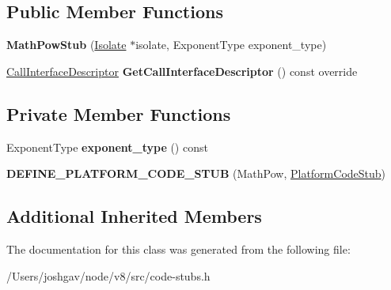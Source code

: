 \subsection*{Public Member Functions}
\begin{DoxyCompactItemize}
\item 
{\bfseries Math\+Pow\+Stub} (\hyperlink{classv8_1_1internal_1_1_isolate}{Isolate} $\ast$isolate, Exponent\+Type exponent\+\_\+type)\hypertarget{classv8_1_1internal_1_1_math_pow_stub_a335e2c420956b65d5c11c4f03143b7e0}{}\label{classv8_1_1internal_1_1_math_pow_stub_a335e2c420956b65d5c11c4f03143b7e0}

\item 
\hyperlink{classv8_1_1internal_1_1_call_interface_descriptor}{Call\+Interface\+Descriptor} {\bfseries Get\+Call\+Interface\+Descriptor} () const  override\hypertarget{classv8_1_1internal_1_1_math_pow_stub_a67765b43b43abda4e5aefa9829fa8385}{}\label{classv8_1_1internal_1_1_math_pow_stub_a67765b43b43abda4e5aefa9829fa8385}

\end{DoxyCompactItemize}
\subsection*{Private Member Functions}
\begin{DoxyCompactItemize}
\item 
Exponent\+Type {\bfseries exponent\+\_\+type} () const \hypertarget{classv8_1_1internal_1_1_math_pow_stub_a267f713193583d40d38e02ceb51c3126}{}\label{classv8_1_1internal_1_1_math_pow_stub_a267f713193583d40d38e02ceb51c3126}

\item 
{\bfseries D\+E\+F\+I\+N\+E\+\_\+\+P\+L\+A\+T\+F\+O\+R\+M\+\_\+\+C\+O\+D\+E\+\_\+\+S\+T\+UB} (Math\+Pow, \hyperlink{classv8_1_1internal_1_1_platform_code_stub}{Platform\+Code\+Stub})\hypertarget{classv8_1_1internal_1_1_math_pow_stub_a3b6d927b02f4d678ffe050307866df7d}{}\label{classv8_1_1internal_1_1_math_pow_stub_a3b6d927b02f4d678ffe050307866df7d}

\end{DoxyCompactItemize}
\subsection*{Additional Inherited Members}


The documentation for this class was generated from the following file\+:\begin{DoxyCompactItemize}
\item 
/\+Users/joshgav/node/v8/src/code-\/stubs.\+h\end{DoxyCompactItemize}

